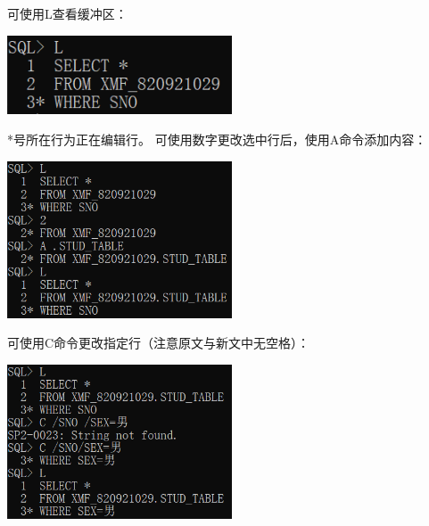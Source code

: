 \documentclass[11pt, a4paper, oneside, UTF8]{ctexbook}
\begin{document}
可使用L查看缓冲区：

\begin{center}
  \begin{minipage}{\textwidth}
    \center
    \includegraphics[width=0.5\textwidth]{picture/L命令效果.png}
    \captionsetup{hypcap=false}
    \label{fig:L命令效果}
  \end{minipage}
\end{center}

*号所在行为正在编辑行。
可使用数字更改选中行后，使用A命令添加内容：

\begin{center}
  \begin{minipage}{\textwidth}
    \center
    \includegraphics[width=0.5\textwidth]{picture/A命令效果.png}
    \captionsetup{hypcap=false}
    \label{fig:A命令效果}
  \end{minipage}
\end{center}

可使用C命令更改指定行（注意原文与新文中无空格）：

\begin{center}
  \begin{minipage}{\textwidth}
    \center
    \includegraphics[width=0.5\textwidth]{picture/C命令效果.png}
    \captionsetup{hypcap=false}
    \label{fig:C命令效果}
  \end{minipage}
\end{center}
\end{document}
